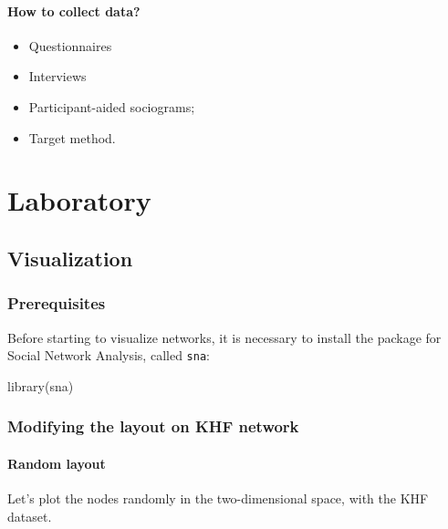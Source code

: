 \documentclass[
  notitlepage,
  onecolumn,
  openany]{book}
\newenvironment{Shaded}{\begin{snugshade}}{\end{snugshade}}
\newcommand{\FunctionTok}[1]{\textcolor[rgb]{0.00,0.00,0.00}{#1}}
\newcommand{\NormalTok}[1]{#1}
\providecommand{\tightlist}{%
  \setlength{\itemsep}{0pt}\setlength{\parskip}{0pt}}
\begin{document}
\hypertarget{how-to-collect-data}{%
\subsection{How to collect data?}\label{how-to-collect-data}}

\begin{itemize}
\tightlist
\item
  Questionnaires
\item
  Interviews
\item
  Participant-aided sociograms;
\item
  Target method.
\end{itemize}

\part{Laboratory}

\hypertarget{visualization}{%
\chapter{Visualization}\label{visualization}}

\hypertarget{prerequisites}{%
\section{Prerequisites}\label{prerequisites}}

Before starting to visualize networks, it is necessary to install the package for Social Network Analysis, called \texttt{sna}:

\begin{Shaded}
\begin{Highlighting}[]
\FunctionTok{library}\NormalTok{(sna)}
\end{Highlighting}
\end{Shaded}

\hypertarget{modifying-the-layout-on-khf-network}{%
\section{Modifying the layout on KHF network}\label{modifying-the-layout-on-khf-network}}

\hypertarget{random-layout}{%
\subsection{Random layout}\label{random-layout}}

Let's plot the nodes randomly in the two-dimensional space, with the KHF dataset.
\end{document}

